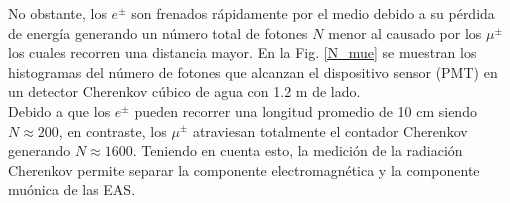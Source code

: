 No obstante, los $e^{\pm}$ son frenados rápidamente por el medio debido a su pérdida de energía generando un número total de fotones $N$ menor al causado por los $\mu^{\pm}$ los cuales recorren una distancia mayor. En la Fig. \ref{N_mue} se muestran los histogramas del número de fotones que alcanzan el dispositivo sensor (PMT) en un detector Cherenkov cúbico de agua con 1.2 m de lado. \\

Debido a que los $e^{\pm}$ pueden recorrer una longitud promedio de 10 cm siendo $N \approx 200$, en contraste, los $\mu^{\pm}$ atraviesan totalmente el contador Cherenkov generando $N \approx 1600$. Teniendo en cuenta esto, la medición de la radiación Cherenkov permite separar la componente electromagnética y la componente muónica de las EAS.
